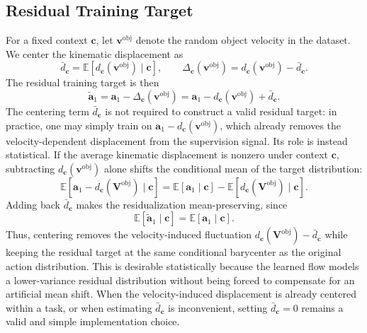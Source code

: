 \documentclass[10pt,twocolumn,letterpaper]{article}
\begin{document}
\subsection{Residual Training Target}
\label{subsec:residual_target}

For a fixed context $\mathbf c$, let $\mathbf v^{\mathrm{obj}}$ denote the random object
velocity in the dataset. We center the kinematic displacement as
\[
    \bar d_{\mathbf c}
    =
    \mathbb E[d_{\mathbf c}(\mathbf v^{\mathrm{obj}})\mid\mathbf c],
    \qquad
    \Delta_{\mathbf c}(\mathbf v^{\mathrm{obj}})
    =
    d_{\mathbf c}(\mathbf v^{\mathrm{obj}})-\bar d_{\mathbf c}.
\]
The residual training target is then
\begin{equation}
    \widetilde{\mathbf a}_1
    =
    \mathbf a_1-\Delta_{\mathbf c}(\mathbf v^{\mathrm{obj}})
    =
    \mathbf a_1-d_{\mathbf c}(\mathbf v^{\mathrm{obj}})+\bar d_{\mathbf c}.
    \label{eq:residual_target}
\end{equation}
The centering term $\bar d_{\mathbf c}$ is not required to construct a valid
residual target: in practice, one may simply train on
$\mathbf a_1-d_{\mathbf c}(\mathbf v^{\mathrm{obj}})$, which already removes the
velocity-dependent displacement from the supervision signal. Its role is instead
statistical. If the average kinematic displacement is nonzero under context
$\mathbf c$, subtracting $d_{\mathbf c}(\mathbf v^{\mathrm{obj}})$ alone shifts the
conditional mean of the target distribution:
\[
    \mathbb E[\mathbf a_1-d_{\mathbf c}(\mathbf V^{\mathrm{obj}})\mid \mathbf c]
    =
    \mathbb E[\mathbf a_1\mid \mathbf c]
    -
    \mathbb E[d_{\mathbf c}(\mathbf V^{\mathrm{obj}})\mid \mathbf c].
\]
Adding back $\bar d_{\mathbf c}$ makes the residualization mean-preserving,
since
\[
    \mathbb E[\widetilde{\mathbf a}_1\mid \mathbf c]
    =
    \mathbb E[\mathbf a_1\mid \mathbf c].
\]
Thus, centering removes the velocity-induced fluctuation
$d_{\mathbf c}(\mathbf V^{\mathrm{obj}})-\bar d_{\mathbf c}$ while keeping the residual
target at the same conditional barycenter as the original action distribution.
This is desirable statistically because the learned flow models a lower-variance
residual distribution without being forced to compensate for an artificial mean
shift. When the velocity-induced displacement is already centered within a task,
or when estimating $\bar d_{\mathbf c}$ is inconvenient, setting
$\bar d_{\mathbf c}=0$ remains a valid and simple implementation choice.
\end{document}

